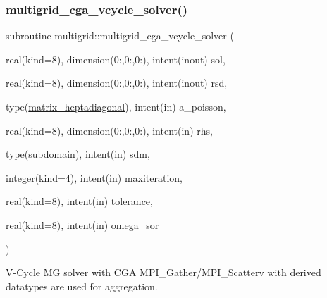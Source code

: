 \subsubsection{\texorpdfstring{multigrid\+\_\+cga\+\_\+vcycle\+\_\+solver()}{multigrid\_cga\_vcycle\_solver()}}
{\footnotesize\ttfamily subroutine multigrid\+::multigrid\+\_\+cga\+\_\+vcycle\+\_\+solver (\begin{DoxyParamCaption}\item[{real(kind=8), dimension(0\+:,0\+:,0\+:), intent(inout)}]{sol,  }\item[{real(kind=8), dimension(0\+:,0\+:,0\+:), intent(inout)}]{rsd,  }\item[{type(\hyperlink{structmatrix_1_1matrix__heptadiagonal}{matrix\+\_\+heptadiagonal}), intent(in)}]{a\+\_\+poisson,  }\item[{real(kind=8), dimension(0\+:,0\+:,0\+:), intent(in)}]{rhs,  }\item[{type(\hyperlink{structgeometry_1_1subdomain}{subdomain}), intent(in)}]{sdm,  }\item[{integer(kind=4), intent(in)}]{maxiteration,  }\item[{real(kind=8), intent(in)}]{tolerance,  }\item[{real(kind=8), intent(in)}]{omega\+\_\+sor }\end{DoxyParamCaption})}



V-\/\+Cycle MG solver with C\+GA  M\+P\+I\+\_\+\+Gather/\+M\+P\+I\+\_\+\+Scatterv with derived datatypes are used for aggregation. 


